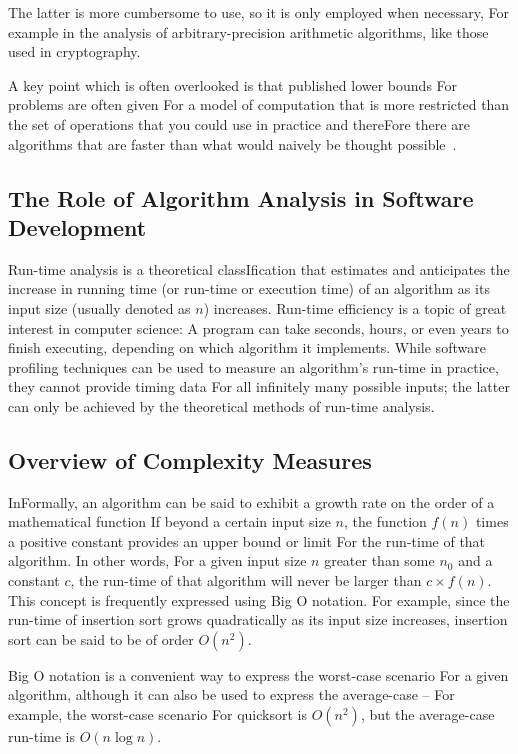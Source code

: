 \documentclass[12pt]{book} %
\begin{document}
The latter is more cumbersome to use, so it is only employed when necessary, For example in the analysis of arbitrary-precision arithmetic algorithms, like those used in cryptography.

A key point which is often overlooked is that published lower bounds For problems are often given For a model of computation that is more restricted than the set of operations that you could use in practice and thereFore there are algorithms that are faster than what would naively be thought possible~\cite{PriceAbstraction}.

\subsection{The Role of Algorithm Analysis in Software Development}
Run-time analysis is a theoretical classIfication that estimates and anticipates the increase in running time (or run-time or execution time) of an algorithm as its input size (usually denoted as $n$) increases. Run-time efficiency is a topic of great interest in computer science: A program can take seconds, hours, or even years to finish executing, depending on which algorithm it implements. While software profiling techniques can be used to measure an algorithm's run-time in practice, they cannot provide timing data For all infinitely many possible inputs; the latter can only be achieved by the theoretical methods of run-time analysis.

\subsection{Overview of Complexity Measures}
InFormally, an algorithm can be said to exhibit a growth rate on the order of a mathematical function If beyond a certain input size $n$, the function $f(n)$ times a positive constant provides an upper bound or limit For the run-time of that algorithm. In other words, For a given input size $n$ greater than some $n_0$ and a constant $c$, the run-time of that algorithm will never be larger than $c \times f(n)$. This concept is frequently expressed using Big O notation. For example, since the run-time of insertion sort grows quadratically as its input size increases, insertion sort can be said to be of order $O(n^2)$.

Big O notation is a convenient way to express the worst-case scenario For a given algorithm, although it can also be used to express the average-case -- For example, the worst-case scenario For quicksort is $O(n^2)$, but the average-case run-time is $O(n \log n)$.
\end{document}
